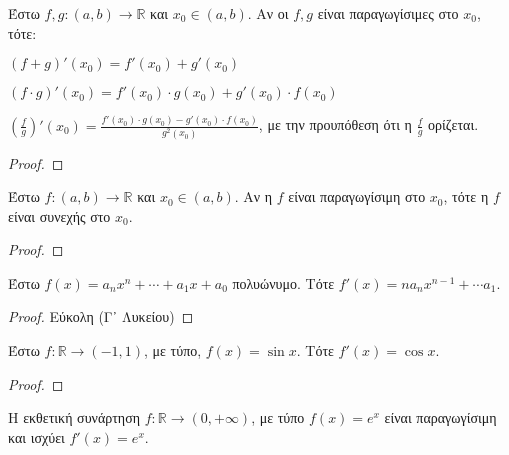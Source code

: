 \documentclass[main.tex]{subfiles}
\begin{document}
\begin{examples}
\end{examples}

\begin{thm}
    Έστω $ f,g \colon (a,b) \to \mathbb{R} $ και $ x_{0} \in (a,b) $. Αν οι $ f,g $ 
    είναι παραγωγίσιμες στο $ x_{0} $, τότε:
    \begin{myitemize}
    \item $ (f+g)'(x_{0}) = f'(x_{0}) + g'(x_{0})$
    \item $ (f\cdot g)'(x_{0}) = f'(x_{0}) \cdot g(x_{0}) + g'(x_{0})\cdot f(x_{0}) $
    \item $ \left(\frac{f}{g}\right)'(x_{0}) = \frac{f'(x_{0})
            \cdot g(x_{0}) - g'(x_{0})\cdot f(x_{0})}{g^{2}(x_{0})} $,
            με την προυπόθεση ότι η $ \frac{f}{g} $ ορίζεται.
    \end{myitemize}
\end{thm}

\begin{proof}
    
\end{proof}

\begin{prop}
    Έστω $ f \colon (a,b) \to \mathbb{R} $ και $ x_{0} \in (a,b) $. Αν η $f$ είναι 
    παραγωγίσιμη στο $ x_{0} $, τότε η $f$ είναι συνεχής στο $ x_{0} $.
\end{prop}

\begin{proof}
    
\end{proof}

\begin{prop}
    Έστω $ f(x) = a_{n}x^{n} + \cdots + a_{1}x + a_{0} $ πολυώνυμο. Τότε 
    $ f'(x) = n a_{n}x^{n-1} + \cdots a_{1} $.
\end{prop}

\begin{proof}
    Εύκολη (Γ᾽ Λυκείου)
\end{proof}

\begin{prop}
    Έστω $ f \colon \mathbb{R} \to (-1,1)$, με τύπο, $ f(x) = \sin{x} $. Τότε 
    $ f'(x) = \cos{x} $.
\end{prop}

\begin{proof}
    
\end{proof}

\begin{prop}
    Η εκθετική συνάρτηση $ f \colon \mathbb{R} \to (0,+ \infty) $, με τύπο 
    $ f(x) = e^{x} $ είναι παραγωγίσιμη και ισχύει $ f'(x) = e^{x} $.
\end{prop}
\end{document}
